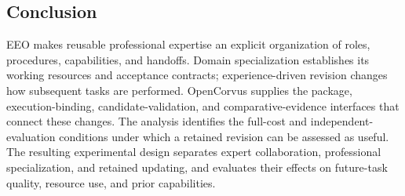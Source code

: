 \subsection{Conclusion}
EEO makes reusable professional expertise an explicit organization of roles, procedures, capabilities, and handoffs. Domain specialization establishes its working resources and acceptance contracts; experience-driven revision changes how subsequent tasks are performed. OpenCorvus supplies the package, execution-binding, candidate-validation, and comparative-evidence interfaces that connect these changes. The analysis identifies the full-cost and independent-evaluation conditions under which a retained revision can be assessed as useful. The resulting experimental design separates expert collaboration, professional specialization, and retained updating, and evaluates their effects on future-task quality, resource use, and prior capabilities.
